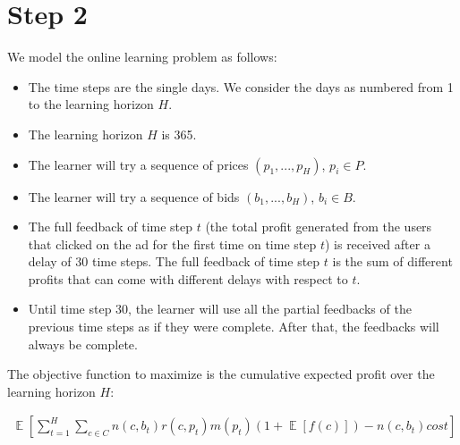 \documentclass[11pt]{article} %
\DeclareMathOperator{\EX}{\mathbb{E}}
\begin{document}
\section{Step 2}
We model the online learning problem as follows:
\begin{itemize}
\item The time steps are the single days. We consider the days as numbered from 1 to the learning horizon $H$.
\item The learning horizon $H$ is 365.
\item The learner will try a sequence of prices $(p_1, ..., p_H)$, $p_i \in P$.
\item The learner will try a sequence of bids $(b_1, ..., b_H)$, $b_i \in B$.
\item The full feedback of time step $t$ (the total profit generated from the users that clicked on the ad for the first time on time step $t$) is received after a delay of 30 time steps. The full feedback of time step $t$ is the sum of different profits that can come with different delays with respect to $t$.
\item Until time step 30, the learner will use all the partial feedbacks of the previous time steps as if they were complete. After that, the feedbacks will always be complete.
\end{itemize}

The objective function to maximize is the cumulative expected profit over the learning horizon $H$:

\begin{align*}
\EX\left[\sum_{t=1}^H{\sum_{c \in C}{n(c,b_t)r(c,p_t)m(p_t)(1+\EX[f(c)])-n(c,b_t)cost}}\right]
\end{align*}
\end{document}
